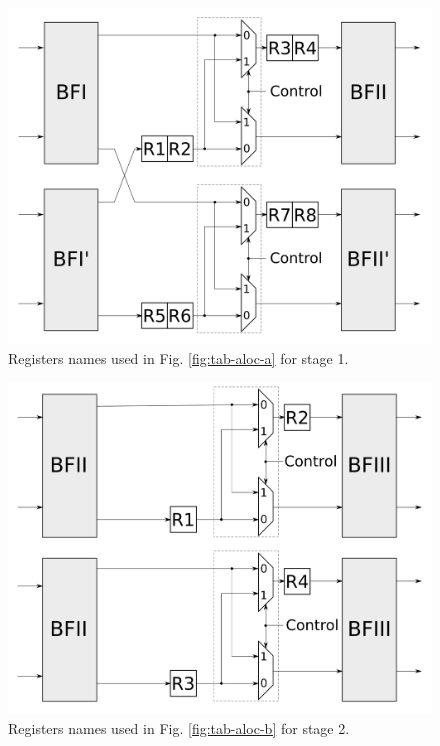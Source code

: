 \documentclass[journal,comsoc]{IEEEtran}
\begin{document}



    \begin{figure} 
        \centering
        \includegraphics[width=0.85\linewidth]{Diagramas/folding_stage1.png}
        \caption{Registers names used in Fig. \ref{fig:tab-aloc-a} for stage 1.}
        \label{fig:folding16_stage1}
    \end{figure}
  
    \begin{figure} 
        \centering
        \includegraphics[width= 0.85\linewidth]{Diagramas/folding_stage2.png}
        \caption{Registers names used in Fig. \ref{fig:tab-aloc-b} for stage 2.}
        \label{fig:folding16_stage2}
    \end{figure}
        
\end{document}
